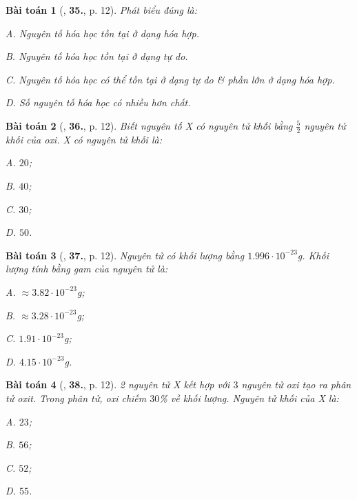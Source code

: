 \documentclass{article}
\numberwithin{equation}{section}
\newtheorem{baitoan}{Bài toán}[section]
\begin{document}
\begin{baitoan}[\cite{An2011}, \textbf{35.}, p. 12]
	Phát biểu đúng là:
	\begin{enumerate*}
		\item[{\rm\sf A.}] Nguyên tố hóa học tồn tại ở dạng hóa hợp.
		\item[{\rm\sf B.}] Nguyên tố hóa học tồn tại ở dạng tự do.
		\item[{\rm\sf C.}] Nguyên tố hóa học có thể tồn tại ở dạng tự do \& phần lớn ở dạng hóa hợp.
		\item[{\rm\sf D.}] Số nguyên tố hóa học có nhiều hơn chất.
	\end{enumerate*}
\end{baitoan}

\begin{baitoan}[\cite{An2011}, \textbf{36.}, p. 12]
	Biết nguyên tố X có nguyên tử khối bằng $\frac{5}{2}$ nguyên tử khối của oxi. X có nguyên tử khối là:
	\begin{enumerate*}
		\item[{\rm\sf A.}] $20$;
		\item[{\rm\sf B.}] $40$;
		\item[{\rm\sf C.}] $30$;
		\item[{\rm\sf D.}] $50$.
	\end{enumerate*}
\end{baitoan}

\begin{baitoan}[\cite{An2011}, \textbf{37.}, p. 12]
	Nguyên tử  có khối lượng bằng $1.996\cdot 10^{-23}$g. Khối lượng tính bằng gam của nguyên tử  là:
	\begin{enumerate*}
		\item[{\rm\sf A.}] $\approx3.82\cdot10^{-23}$g;
		\item[{\rm\sf B.}] $\approx3.28\cdot10^{-23}$g;
		\item[{\rm\sf C.}] $1.91\cdot10^{-23}$g;
		\item[{\rm\sf D.}] $4.15\cdot10^{-23}$g.
	\end{enumerate*}
\end{baitoan}

\begin{baitoan}[\cite{An2011}, \textbf{38.}, p. 12]
	2 nguyên tử X kết hợp với $3$ nguyên tử oxi tạo ra phân tử oxit. Trong phân tử, oxi chiếm $30$\% về khối lượng. Nguyên tử khối của X là:
	\begin{enumerate*}
		\item[{\rm\sf A.}] $23$;
		\item[{\rm\sf B.}] $56$;
		\item[{\rm\sf C.}] $52$;
		\item[{\rm\sf D.}] $55$.
	\end{enumerate*}
\end{baitoan}
\end{document}
